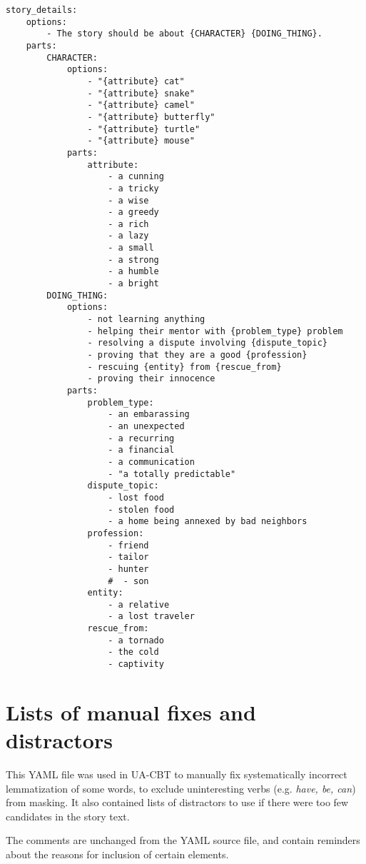\begin{verbatim}
story_details: 
    options: 
        - The story should be about {CHARACTER} {DOING_THING}.
    parts:
        CHARACTER:
            options:
                - "{attribute} cat"
                - "{attribute} snake"
                - "{attribute} camel"
                - "{attribute} butterfly"
                - "{attribute} turtle"
                - "{attribute} mouse"
            parts:
                attribute:
                    - a cunning
                    - a tricky
                    - a wise
                    - a greedy
                    - a rich
                    - a lazy
                    - a small
                    - a strong
                    - a humble
                    - a bright
        DOING_THING:
            options:
                - not learning anything
                - helping their mentor with {problem_type} problem
                - resolving a dispute involving {dispute_topic}
                - proving that they are a good {profession} 
                - rescuing {entity} from {rescue_from}
                - proving their innocence
            parts:
                problem_type:
                    - an embarassing
                    - an unexpected
                    - a recurring
                    - a financial
                    - a communication
                    - "a totally predictable"
                dispute_topic:
                    - lost food
                    - stolen food
                    - a home being annexed by bad neighbors
                profession:
                    - friend
                    - tailor
                    - hunter
                    #  - son
                entity:
                    - a relative
                    - a lost traveler
                rescue_from:
                    - a tornado
                    - the cold
                    - captivity
\end{verbatim}

\section{Lists of manual fixes and distractors}
This YAML file was used in UA-CBT to manually fix systematically incorrect lemmatization of some words, to exclude uninteresting verbs (e.g. \textit{have, be, can}) from masking. 
It also contained lists of distractors to use if there were too few candidates in the story text.

The comments are unchanged from the YAML source file, and contain reminders about the reasons for inclusion of certain elements.


